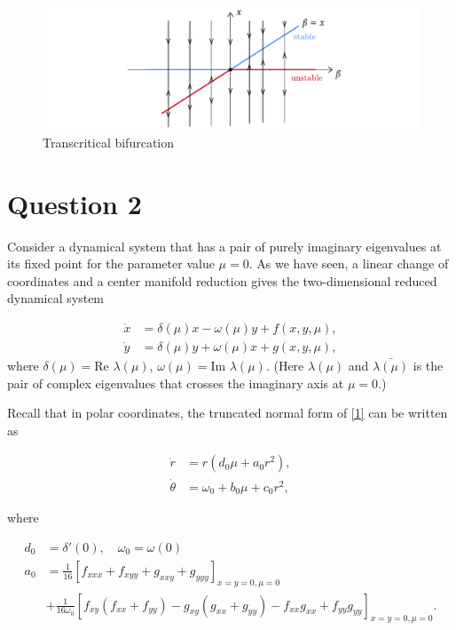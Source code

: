\documentclass[twoside,10pt,a4paper]{article}
\begin{document}
\begin{enumerate}[label=(\alph*)]
\newpage

\begin{figure}[H]
	\centering
	\includegraphics[scale=0.9]{Graphics/S01D01.pdf}
	\caption{Transcritical bifurcation}
\end{figure}

\end{enumerate}

\newpage

\section*{Question 2}
Consider a dynamical system that has a pair of purely imaginary eigenvalues at its fixed point for the parameter value $\mu=0$. As we have seen, a linear change of coordinates and a center manifold reduction gives the two-dimensional reduced dynamical system


\begin{align}
\label{1}
\dot{x} &= \delta(\mu)x - \omega(\mu)y + f(x, y, \mu), \\
\dot{y} &= \delta(\mu)y+\omega(\mu)x + g(x,y,\mu),
\end{align}
where $\delta(\mu)=\text{Re }\lambda(\mu)$, $\omega(\mu) = \text{Im }\lambda(\mu)$. (Here $\lambda(\mu)$ and $\bar{\lambda(\mu)}$ is the pair of complex eigenvalues that crosses the imaginary axis at $\mu=0$.)

Recall that in polar coordinates, the truncated normal form of \eqref{1} can be written as

\begin{align*}
\dot{r} &= r(d_0\mu + a_0 r^2), \\
\dot{\theta} &= \omega_0 + b_0\mu + c_0r^2,
\end{align*}

where

\begin{align*}
d_0 &= \delta'(0), \quad \omega_0 = \omega(0) \\
a_0 &= \frac{1}{16}\left[f_{xxx}+f_{xyy}+g_{xxy}+g_{yyy} \right]_{x=y=0,\mu=0} \\
	&+ \frac{1}{16\omega_0}\left[f_{xy}(f_{xx}+f_{yy}) - g_{xy}(g_{xx} + g_{yy}) - f_{xx}g_{xx}+f_{yy}g_{yy} \right]_{x=y=0, \mu=0}.
\end{align*}
\end{document}
